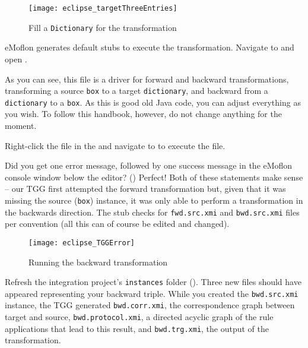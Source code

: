 \begin{stepbystep}
\begin{figure}[htbp]
\begin{center}
  \texttt{[image: eclipse\_targetThreeEntries]}
  \caption{Fill a \texttt{Dictionary} for the transformation}
  \label{eclipse:dictionaryxmi}
\end{center}
\end{figure}

\item eMoflon generates default stubs to execute the transformation.
Navigate to  and open .

\item As you can see, this file is a driver for forward and backward transformations, transforming a source \texttt{box} to a target \texttt{dictionary}, and backward from a \texttt{dictionary} to a \texttt{box}. 
As this is good old Java code, you can adjust everything as you wish.
To follow this handbook, however, do not change anything for the moment.

\item Right-click the file in the  and navigate to  to execute the file.

\item Did you get one error message, followed by one success message in the eMoflon console window below
the editor? ()
Perfect!
Both of these statements make sense -- our TGG first attempted the forward transformation but, given that it was missing the source (\texttt{box}) instance, it was only able to perform a transformation in the backwards direction.
The stub checks for \texttt{fwd.src.xmi} and \texttt{bwd.src.xmi} files per convention (all this can of course be edited and changed).

\begin{figure}[htbp]
\begin{center}
  \texttt{[image: eclipse\_TGGError]}
  \caption{Running the backward transformation}
  \label{eclipse:tggERROR}
\end{center}
\end{figure}

\item Refresh the integration project's \texttt{instances} folder (). 
Three new  files should have appeared representing your backward triple. 
While you created the \texttt{bwd.src.xmi} instance, the TGG generated \texttt{bwd.corr.xmi}, the correspondence graph between target and source, \texttt{bwd.protocol.xmi}, a directed acyclic graph of the rule applications that lead to this result, and \texttt{bwd.trg.xmi}, the output of the transformation. 


\end{stepbystep}
